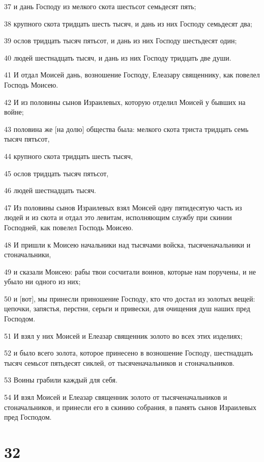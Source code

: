 \par 37 и дань Господу из мелкого скота шестьсот семьдесят пять;
\par 38 крупного скота тридцать шесть тысяч, и дань из них Господу семьдесят два;
\par 39 ослов тридцать тысяч пятьсот, и дань из них Господу шестьдесят один;
\par 40 людей шестнадцать тысяч, и дань из них Господу тридцать две души.
\par 41 И отдал Моисей дань, возношение Господу, Елеазару священнику, как повелел Господь Моисею.
\par 42 И из половины сынов Израилевых, которую отделил Моисей у бывших на войне;
\par 43 половина же [на долю] общества была: мелкого скота триста тридцать семь тысяч пятьсот,
\par 44 крупного скота тридцать шесть тысяч,
\par 45 ослов тридцать тысяч пятьсот,
\par 46 людей шестнадцать тысяч.
\par 47 Из половины сынов Израилевых взял Моисей одну пятидесятую часть из людей и из скота и отдал это левитам, исполняющим службу при скинии Господней, как повелел Господь Моисею.
\par 48 И пришли к Моисею начальники над тысячами войска, тысяченачальники и стоначальники,
\par 49 и сказали Моисею: рабы твои сосчитали воинов, которые нам поручены, и не убыло ни одного из них;
\par 50 и [вот], мы принесли приношение Господу, кто что достал из золотых вещей: цепочки, запястья, перстни, серьги и привески, для очищения душ наших пред Господом.
\par 51 И взял у них Моисей и Елеазар священник золото во всех этих изделиях;
\par 52 и было всего золота, которое принесено в возношение Господу, шестнадцать тысяч семьсот пятьдесят сиклей, от тысяченачальников и стоначальников.
\par 53 Воины грабили каждый для себя.
\par 54 И взял Моисей и Елеазар священник золото от тысяченачальников и стоначальников, и принесли его в скинию собрания, в память сынов Израилевых пред Господом.

\chapter{32}

